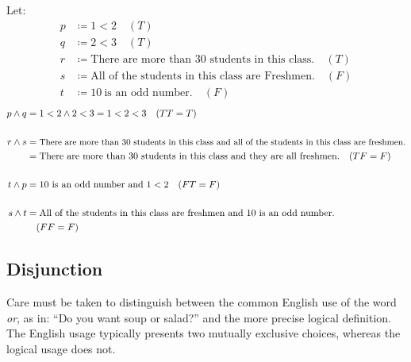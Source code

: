 \documentclass[letterpaper,12pt,fleqn]{article}
\begin{document}
\begin{examples}
  Let:
  \begin{align*}
    p &\coloneqq 1<2\quad(T) \\
    q &\coloneqq 2<3\quad(T) \\
    r &\coloneqq \text{There are more than 30 students in this class.}\quad(T) \\
    s &\coloneqq \text{All of the students in this class are Freshmen.}\quad(F) \\
    t &\coloneqq 10\ \text{is an odd number.}\quad(F)
  \end{align*}
  \begin{align*}
    p\land q &= 1<2\land 2<3=1<2<3\quad(TT=T) \\
    \\
    r\land s &= \text{\small There are more than 30 students in this class and all of the students in this class are
      freshmen.} \\
    &= \text{There are more than 30 students in this class and they are all freshmen.}\quad(TF=F) \\
    \\
    t\land p &= 10\ \text{is an odd number and}\ 1<2\quad(FT=F) \\
    \\
    s\land t &= \text{All of the students in this class are freshmen and}\ 10\ \text{is an odd number.} \\
    & \quad(FF=F)
  \end{align*}
\end{examples}

\subsection*{Disjunction}

Care must be taken to distinguish between the common English use of the word \emph{or}, as in: ``Do you want soup
or salad?'' and the more precise logical definition.  The English usage typically presents two mutually exclusive
choices, whereas the logical usage does not.
\end{document}
